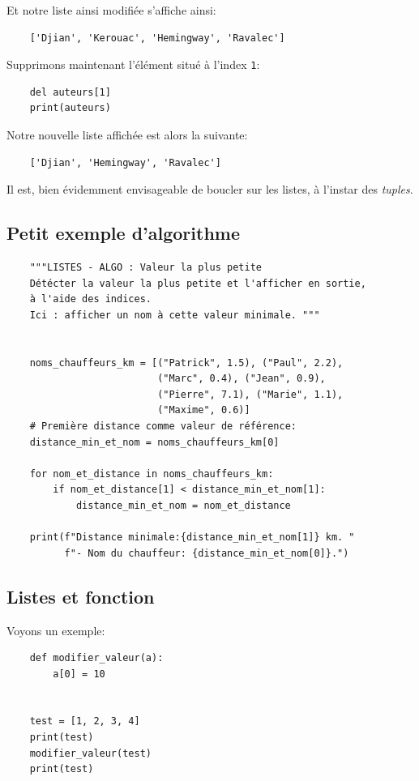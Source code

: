 \documentclass[a4paper,12pt]{book}
\begin{document}
Et notre liste ainsi modifiée s'affiche ainsi:
\begin{verbatim}
    ['Djian', 'Kerouac', 'Hemingway', 'Ravalec']  
\end{verbatim}
\medskip

Supprimons maintenant l'élément situé à l'index \texttt{1}:
\begin{verbatim}
    del auteurs[1]
    print(auteurs)
\end{verbatim}
\medskip

Notre nouvelle liste affichée est alors la suivante:
\begin{verbatim}
    ['Djian', 'Hemingway', 'Ravalec']
\end{verbatim}
\medskip

Il est, bien évidemment envisageable de boucler sur les listes, à l'instar des \textit{tuples}.
\medskip

\subsection*{Petit exemple d'algorithme}
\begin{lstlisting}
    """LISTES - ALGO : Valeur la plus petite
    Détécter la valeur la plus petite et l'afficher en sortie,
    à l'aide des indices.
    Ici : afficher un nom à cette valeur minimale. """


    noms_chauffeurs_km = [("Patrick", 1.5), ("Paul", 2.2), 
                          ("Marc", 0.4), ("Jean", 0.9), 
                          ("Pierre", 7.1), ("Marie", 1.1),
                          ("Maxime", 0.6)]
    # Première distance comme valeur de référence:
    distance_min_et_nom = noms_chauffeurs_km[0]  

    for nom_et_distance in noms_chauffeurs_km:
        if nom_et_distance[1] < distance_min_et_nom[1]:
            distance_min_et_nom = nom_et_distance

    print(f"Distance minimale:{distance_min_et_nom[1]} km. "
          f"- Nom du chauffeur: {distance_min_et_nom[0]}.")
\end{lstlisting}
\medskip

\subsection*{Listes et fonction}
Voyons un exemple:
\begin{lstlisting}
    def modifier_valeur(a):
        a[0] = 10
    
    
    test = [1, 2, 3, 4]
    print(test)
    modifier_valeur(test)
    print(test)
\end{lstlisting}
\medskip
\end{document}
